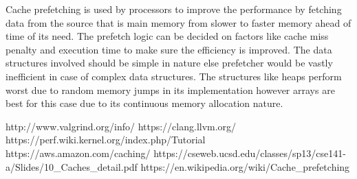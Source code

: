\documentclass{article}
\begin{document}
\bigskip
Cache prefetching\cite{prefetch} is used by processors to improve the performance by fetching data from the source that is main memory from slower to faster memory ahead of time of its need. The prefetch logic can be decided on factors like cache miss penalty and execution time to make sure the efficiency is improved. The data structures involved should be simple in nature else prefetcher would be vastly inefficient in case of complex data structures. The structures like heaps perform worst due to random memory jumps in its implementation however arrays are best for this case due to its continuous memory allocation nature.

\bigskip

\begin{thebibliography}{9}
http://www.valgrind.org/info/
https://clang.llvm.org/
 https://perf.wiki.kernel.org/index.php/Tutorial
https://aws.amazon.com/caching/
https://cseweb.ucsd.edu/classes/sp13/cse141-a/Slides/10\_Caches\_detail.pdf
https://en.wikipedia.org/wiki/Cache\_prefetching

\end{thebibliography}
\end{document}
